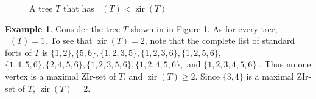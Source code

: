 \documentclass{article}
\numberwithin{figure}{section}
\numberwithin{table}{section}
\numberwithin{equation}{section}
\theoremstyle{definition}
\theoremstyle{definition}
\theoremstyle{definition}
\newtheorem{ex}[thm]{Example}
\DeclareMathOperator{\zir}{zir}
\DeclareMathOperator{\zpir}{z_+ir}
\begin{document}
\begin{figure}[!h]
\centering
{}
\caption{\label{f:z+ir-zir} A tree $T$ that has $\zpir(T)<\zir(T)$}
\end{figure}
\begin{ex}
    Consider the tree $T$ shown in in Figure \ref{f:z+ir-zir}.  As for every tree, $\zpir(T)=1$. To see that $\zir(T)=2$, note that  
    the complete list of  standard forts of $T$ is 
    $\{1,2\},\{5,6\}, \{1, 2, 3, 5\}, \{1, 2, 3, 6\}, \{1, 2, 5, 6\},$ $\{1, 4, 5, 6\}, \{2, 4, 5, 6\}, \{1, 2, 3, 5, 6\}, \{1, 2, 4, 5, 6\},  $ and $ \{1,2,3,4,5,6\}$ \cite{sage:irred}.  Thus no one vertex is a maximal ZIr-set of $T$, and $\zir(T)\ge 2$.  
 Since $\{3,4\}$ is a maximal ZIr-set of $T$,  $\zir(T)=2$.  
\end{ex}
\end{document}
